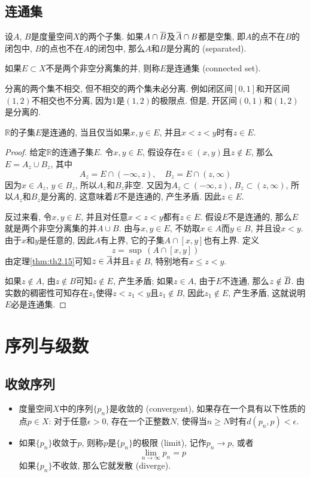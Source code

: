 \documentclass[cn,12pt,math=mtpro2,citestyle=gb7714-2015,bibstyle=gb7714-2015,twocol]{elegantbook}
\newcommand{\R}{\mathbb{R}}
\newcommand{\limn}{\lim_{n\to\infty}}
\newcommand{\overbar}[1]{\mkern 1.5mu\overline{\mkern-1.5mu#1\mkern-1.5mu}\mkern 1.5mu}
\begin{document}
\section{连通集}
\begin{definition}
设$A$, $B$是度量空间$X$的两个子集. 如果$A\cap\overbar{B}$及$\overbar{A}\cap B$都是空集, 即$A$的点不在$B$的闭包中, $B$的点也不在$A$的闭包中, 那么$A$和$B$是分离的 (separated).

如果$E\subset X$不是两个非空分离集的并, 则称$E$是连通集 (connected set).
\end{definition}
\begin{remark}
分离的两个集不相交, 但不相交的两个集未必分离. 例如闭区间$[0,1]$和开区间$(1,2)$不相交也不分离, 因为$1$是$(1,2)$的极限点. 但是, 开区间$(0,1)$和$(1,2)$是分离的.
\end{remark}
\begin{theorem}\label{thm:th2.19}
  $\R$的子集$E$是连通的, 当且仅当如果$x,y\in E$, 并且$x<z<y$时有$z\in E$.
\end{theorem}
\begin{proof}
  给定$\R$的连通子集$E$. 令$x,y\in E$, 假设存在$z\in (x,y)$且$z\notin E$, 那么$E=A_z\cup B_z$, 其中
  $$A_z=E\cap (-\infty,z),\quad B_z=E\cap(z,\infty)$$
  因为$x\in A_z$, $y\in B_z$, 所以$A_z$和$B_z$非空. 又因为$A_z\subset(-\infty,z)$, $B_z\subset(z,\infty)$, 所以$A_z$和$B_z$是分离的, 这意味着$E$不是连通的, 产生矛盾. 因此$z\in E$.

  反过来看, 令$x,y\in E$, 并且对任意$x<z<y$都有$z\in E$. 假设$E$不是连通的, 那么$E$就是两个非空分离集的并$A\cup B$. 由与$x,y\in E$, 不妨取$x\in A$而$y \in B$, 并且设$x<y$. 由于$x$和$y$是任意的, 因此$A$有上界, 它的子集$A\cap[x,y]$也有上界. 定义
  $$z=\sup\, (A\cap [x,y])$$
  由定理\ref{thm:th2.15}可知$z\in \overbar{A}$并且$z\notin B$, 特别地有$x\leq z<y$.

  如果$z\notin A$, 由$z\notin B$可知$z\notin E$, 产生矛盾; 如果$z\in A$, 由于$E$不连通, 那么$z\notin \overbar{B}$. 由实数的稠密性可知存在$z_1$使得$z<z_1<y$且$z_1\notin B$, 因此$z_1\notin E$, 产生矛盾, 这就说明$E$必是连通集.


\end{proof}
\chapter{序列与级数}
\section{收敛序列}
\begin{definition}
\begin{itemize}
\item 度量空间$X$中的序列$\{p_n\}$是收敛的 (convergent), 如果存在一个具有以下性质的点$p\in X$: 对于任意$\epsilon>0$, 存在一个正整数$N$, 使得当$n\geq N$时有$d(p_n,p)<\epsilon$.

\item 如果$\{p_n\}$收敛于$p$, 则称$p$是$\{p_n\}$的极限 (limit), 记作$p_n\rightarrow p$, 或者
$$\limn  p_n=p$$
如果$\{p_n\}$不收敛, 那么它就发散 (diverge).
\end{itemize}
\end{definition}
\end{document}

